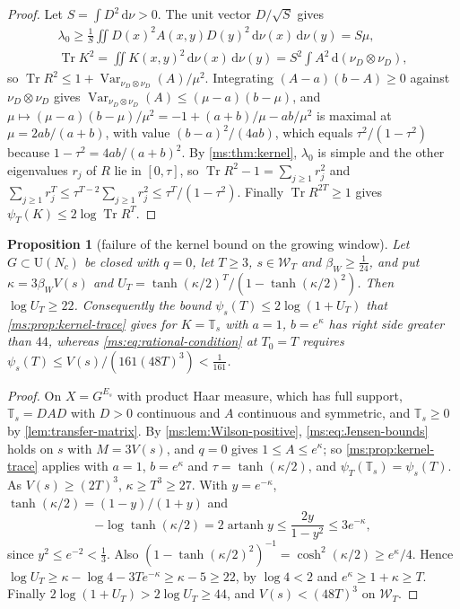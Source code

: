\documentclass[11pt,a4paper]{amsart}
\newtheorem{proposition}[theorem]{Proposition}
\theoremstyle{definition}
\theoremstyle{remark}
\numberwithin{equation}{section}
\DeclareMathOperator{\Tr}{Tr}        %
\DeclareMathOperator{\Var}{Var}      %
\newcommand{\Wwin}{\mathcal{W}}      %
\newcommand{\dd}{\,\mathrm{d}}             %
\newcommand{\U}{\mathrm{U}}                %
\newcommand{\TT}{\mathbb{T}}               %
\newcommand{\psiT}[2]{\psi_{#1}(#2)}       %
\newcommand{\Vol}[1]{V(#1)}                %
\newcommand{\betaW}{\beta_{W}}             %
\begin{document}
\begin{proof}
Let $S=\int D^2\dd\nu>0$. The unit vector $D/\sqrt S$ gives
\begin{gather*}
\lambda_0\ge\frac1S\iint D(x)^2A(x,y)D(y)^2\dd\nu(x)\dd\nu(y)=S\mu,\\
\Tr K^2=\iint K(x,y)^2\dd\nu(x)\dd\nu(y)=S^2\int A^2\dd(\nu_D\otimes\nu_D),
\end{gather*}
so $\Tr R^2\le1+\Var_{\nu_D\otimes\nu_D}(A)/\mu^2$. Integrating $(A-a)(b-A)\ge0$ against $\nu_D\otimes\nu_D$ gives $\Var_{\nu_D\otimes\nu_D}(A)\le(\mu-a)(b-\mu)$, and $\mu\mapsto(\mu-a)(b-\mu)/\mu^2=-1+(a+b)/\mu-ab/\mu^2$ is maximal at $\mu=2ab/(a+b)$, with value $(b-a)^2/(4ab)$, which equals $\tau^2/(1-\tau^2)$ because $1-\tau^2=4ab/(a+b)^2$. By \cref{ms:thm:kernel}, $\lambda_0$ is simple and the other eigenvalues $r_j$ of $R$ lie in $[0,\tau]$, so $\Tr R^2-1=\sum_{j\ge1}r_j^2$ and $\sum_{j\ge1}r_j^T\le\tau^{T-2}\sum_{j\ge1}r_j^2\le\tau^T/(1-\tau^2)$. Finally $\Tr R^{2T}\ge1$ gives $\psi_T(K)\le2\log\Tr R^T$.
\end{proof}

\begin{proposition}[failure of the kernel bound on the growing window]\label{ms:prop:window-failure}
Let $G\subset\U(N_c)$ be closed with $q=0$, let $T\ge3$, $s\in\Wwin_T$ and $\betaW\ge\frac1{24}$, and put $\kappa=3\betaW\Vol{s}$ and $U_T=\tanh(\kappa/2)^T/(1-\tanh(\kappa/2)^2)$. Then $\log U_T\ge22$. Consequently the bound $\psiT{s}{T}\le2\log(1+U_T)$ that \cref{ms:prop:kernel-trace} gives for $K=\TT_s$ with $a=1$, $b=e^\kappa$ has right side greater than $44$, whereas \eqref{ms:eq:rational-condition} at $T_0=T$ requires $\psiT{s}{T}\le\Vol{s}/(161(48T)^3)<\frac1{161}$.
\end{proposition}

\begin{proof}
On $X=G^{E_s}$ with product Haar measure, which has full support, $\TT_s=DAD$ with $D>0$ continuous and $A$ continuous and symmetric, and $\TT_s\ge0$ by \cref{lem:transfer-matrix}. By \cref{ms:lem:Wilson-positive}, \eqref{ms:eq:Jensen-bounds} holds on $s$ with $M=3\Vol{s}$, and $q=0$ gives $1\le A\le e^\kappa$; so \cref{ms:prop:kernel-trace} applies with $a=1$, $b=e^\kappa$ and $\tau=\tanh(\kappa/2)$, and $\psi_T(\TT_s)=\psiT{s}{T}$. As $\Vol{s}\ge(2T)^3$, $\kappa\ge T^3\ge27$. With $y=e^{-\kappa}$, $\tanh(\kappa/2)=(1-y)/(1+y)$ and
\[
-\log\tanh(\kappa/2)=2\operatorname{artanh}y\le\frac{2y}{1-y^2}\le3e^{-\kappa},
\]
since $y^2\le e^{-2}<\frac13$. Also $(1-\tanh(\kappa/2)^2)^{-1}=\cosh^2(\kappa/2)\ge e^\kappa/4$. Hence $\log U_T\ge\kappa-\log4-3Te^{-\kappa}\ge\kappa-5\ge22$, by $\log4<2$ and $e^\kappa\ge1+\kappa\ge T$. Finally $2\log(1+U_T)>2\log U_T\ge44$, and $\Vol{s}<(48T)^3$ on $\Wwin_T$.
\end{proof}
\end{document}
